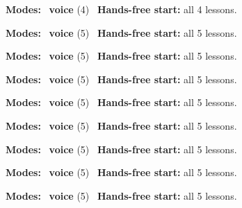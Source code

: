 \expandafter\def\csname hlchaptermodality23\endcsname{%
  {\small\noindent
    \textbf{Modes:} \hlvoicesign{}~\textbf{voice} (4)\quad
    \hlvoicesign{}~\textbf{Hands-free start:} all 4 lessons.%
    \par}\medskip
}

\expandafter\def\csname hlchaptermodality24\endcsname{%
  {\small\noindent
    \textbf{Modes:} \hlvoicesign{}~\textbf{voice} (5)\quad
    \hlvoicesign{}~\textbf{Hands-free start:} all 5 lessons.%
    \par}\medskip
}

\expandafter\def\csname hlchaptermodality25\endcsname{%
  {\small\noindent
    \textbf{Modes:} \hlvoicesign{}~\textbf{voice} (5)\quad
    \hlvoicesign{}~\textbf{Hands-free start:} all 5 lessons.%
    \par}\medskip
}

\expandafter\def\csname hlchaptermodality26\endcsname{%
  {\small\noindent
    \textbf{Modes:} \hlvoicesign{}~\textbf{voice} (5)\quad
    \hlvoicesign{}~\textbf{Hands-free start:} all 5 lessons.%
    \par}\medskip
}

\expandafter\def\csname hlchaptermodality27\endcsname{%
  {\small\noindent
    \textbf{Modes:} \hlvoicesign{}~\textbf{voice} (5)\quad
    \hlvoicesign{}~\textbf{Hands-free start:} all 5 lessons.%
    \par}\medskip
}

\expandafter\def\csname hlchaptermodality28\endcsname{%
  {\small\noindent
    \textbf{Modes:} \hlvoicesign{}~\textbf{voice} (5)\quad
    \hlvoicesign{}~\textbf{Hands-free start:} all 5 lessons.%
    \par}\medskip
}

\expandafter\def\csname hlchaptermodality29\endcsname{%
  {\small\noindent
    \textbf{Modes:} \hlvoicesign{}~\textbf{voice} (5)\quad
    \hlvoicesign{}~\textbf{Hands-free start:} all 5 lessons.%
    \par}\medskip
}

\expandafter\def\csname hlchaptermodality30\endcsname{%
  {\small\noindent
    \textbf{Modes:} \hlvoicesign{}~\textbf{voice} (5)\quad
    \hlvoicesign{}~\textbf{Hands-free start:} all 5 lessons.%
    \par}\medskip
}

\expandafter\def\csname hlchaptermodality31\endcsname{%
  {\small\noindent
    \textbf{Modes:} \hlvoicesign{}~\textbf{voice} (5)\quad
    \hlvoicesign{}~\textbf{Hands-free start:} all 5 lessons.%
    \par}\medskip
}

